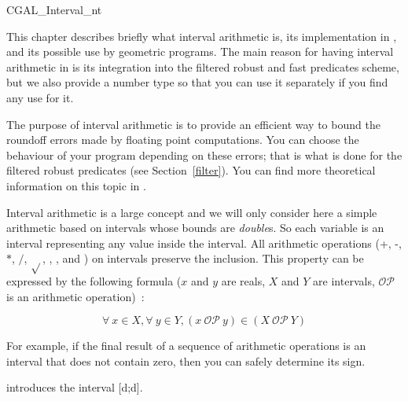 
\begin{ccClass} {CGAL_Interval_nt}
\label{interval}

This chapter describes briefly what interval arithmetic is, its implementation
in {\cgal}, and its possible use by geometric programs.
The main reason for having interval arithmetic in {\cgal} is its integration
into the filtered robust and fast predicates scheme, but we also provide a
number type so that you can use it separately if you find any use for it.


The purpose of interval arithmetic is to provide an efficient way to bound
the roundoff errors made by floating point computations.
You can choose the behaviour of your program depending on these errors; that
is what is done for the filtered robust predicates (see Section~\ref{filter}).
You can find more theoretical information on this topic in
\cite{bbp-iayed-98scg}.

\ccDefinition
Interval arithmetic is a large concept and we will only consider here a 
simple arithmetic based on intervals whose bounds are {\it double}s.
So each variable is an interval representing any value inside the interval.
All arithmetic operations (+, -, $*$, $/$, $\sqrt{}$, ,
,
 and ) on intervals preserve the inclusion.
This property can be expressed by the following formula ($x$ and $y$ are
reals, $X$ and $Y$ are intervals, $\mathcal{OP}$ is an arithmetic operation)~:

$$
\forall\ x \in X, \forall\ y \in Y, (x\ \mathcal{OP}\ y)
\in (X\ \mathcal{OP}\ Y)
$$

For example, if the final result of a sequence of arithmetic operations is
an interval that does not contain zero, then you can safely determine its sign.


\ccCreation

{introduces the interval [d;d].}


\end{ccClass}
